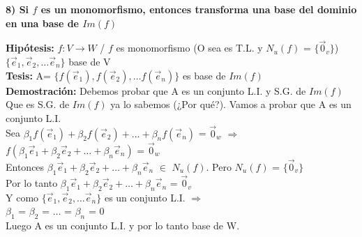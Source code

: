 \documentclass[11pt]{article}
\begin{document}
\vspace{2mm} \noindent
{\Large \bfseries{8) Si $f$ es un monomorfismo, entonces transforma una base del dominio en una base de $Im(f)$}}

\vspace{2mm} \noindent
{\bfseries Hipótesis:} $f: V \rightarrow W$ / $f$ es monomorfismo (O sea es T.L. y $N_u(f)$ = $\{\vec{0}_v\}$) \\
$\{\vec{e}_1, \vec{e}_2, \hdots  \vec{e}_n\}$ base de V \\
{\bfseries Tesis:} A= $\{f(\vec{e}_1), f(\vec{e}_2), \hdots  f(\vec{e}_n)\}$ es base de $Im(f)$ \\
{\bfseries Demostración:} Debemos probar que A es un conjunto L.I. y S.G. de $Im(f)$ \\
Que es S.G. de $Im(f)$ ya lo sabemos (¿Por qué?). Vamos a probar que A es un conjunto L.I. \\
Sea $\beta_1 f(\vec{e}_1) + \beta_2 f(\vec{e}_2) + \hdots + \beta_n f(\vec{e}_n)$ = $\vec{0}_w$ $\Rightarrow$ \\
$f(\beta_1 \vec{e}_1 + \beta_2 \vec{e}_2 + \hdots + \beta_n \vec{e}_n)$ = $\vec{0}_w$ \\
Entonces $\beta_1 \vec{e}_1 + \beta_2 \vec{e}_2 + \hdots + \beta_n \vec{e}_n$ $\in$ $N_u(f)$. Pero $N_u(f)$ = $\{\vec{0}_v\}$ \\
Por lo tanto $\beta_1 \vec{e}_1 + \beta_2 \vec{e}_2 + \hdots + \beta_n \vec{e}_n$ = $\vec{0}_v$ \\
Y como $\{\vec{e}_1, \vec{e}_2, \hdots  \vec{e}_n\}$ es un conjunto L.I. $\Rightarrow$\\
$\beta_1$ = $\beta_2$ = $\hdots$ = $\beta_n$ = 0\\
Luego A es un conjunto L.I. y por lo tanto base de W.
\end{document}
